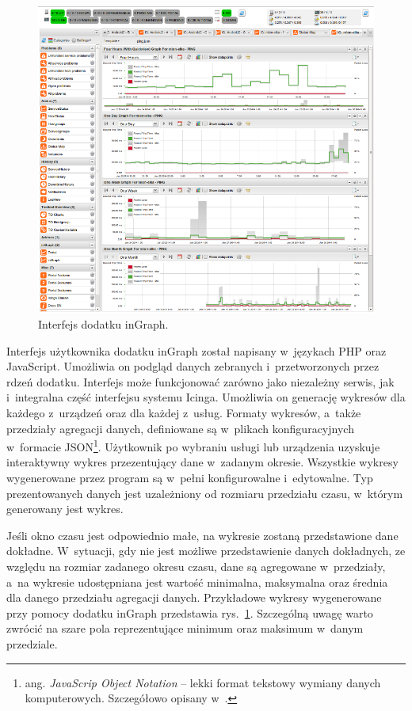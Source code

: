 \begin{figure}[ht]
  \caption{Interfejs dodatku inGraph.}
  \label{fig:inGraph}
\includegraphics[width=1\textwidth]{img/ingraph.png}
\end{figure}

Interfejs użytkownika dodatku inGraph został napisany w~językach PHP
oraz JavaScript. Umożliwia on podgląd danych zebranych
i~przetworzonych przez rdzeń dodatku. Interfejs może funkcjonować
zarówno jako niezależny serwis, jak i~integralna część interfejsu
systemu Icinga. Umożliwia on generację wykresów dla każdego z~urządzeń
oraz dla każdej z~usług. Formaty wykresów, a~także przedziały
agregacji danych, definiowane są w~plikach konfiguracyjnych w~formacie
JSON\footnote{ang. {\em JavaScrip Object Notation} -- lekki format
  tekstowy wymiany danych komputerowych. Szczegółowo opisany
  w~\cite{www:JSON}.}. Użytkownik po wybraniu usługi lub urządzenia
uzyskuje interaktywny wykres przezentujący dane w~zadanym
okresie. Wszystkie wykresy wygenerowane przez program są w~pełni
konfigurowalne i~edytowalne. Typ prezentowanych danych jest
uzależniony od rozmiaru przedziału czasu, w~którym generowany jest
wykres.

Jeśli okno czasu jest odpowiednio małe, na wykresie zostaną
przedstawione dane dokładne. W~sytuacji, gdy nie jest możliwe
przedstawienie danych dokładnych, ze względu na rozmiar zadanego
okresu czasu, dane są agregowane w~przedziały, a~na wykresie
udostępniana jest wartość minimalna, maksymalna oraz średnia dla
danego przedziału agregacji danych. Przykładowe wykresy wygenerowane
przy pomocy dodatku inGraph przedstawia
rys.~\ref{fig:inGraph}. Szczególną uwagę warto zwrócić na szare pola
reprezentujące minimum oraz maksimum w~danym przedziale.


